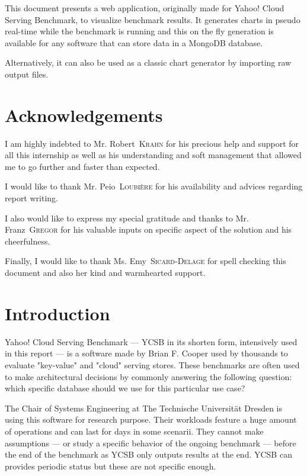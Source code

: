 \documentclass[a4paper,11pt]{report}
\newcommand*{\auteur}[2]{\large #1~\textsc{#2}} %
\begin{document}
This document presents a web application, originally made for Yahoo! Cloud Serving Benchmark, to visualize benchmark results. It generates charts in pseudo real-time while the benchmark is running and this on the fly generation is available for any software that can store data in a MongoDB database. 

Alternatively, it can also be used as a classic chart generator by importing raw output files.

\tableofcontents

\newpage

\listoffigures  %

\newpage
\chapter*{Acknowledgements}

I am highly indebted to Mr. \auteur{Robert}{Krahn} for his precious help and support for all this internship as well as his understanding and soft management that allowed me to go further and faster than expected.

I would like to thank Mr. \auteur{Peio}{Loubière} for his availability and advices regarding report writing.

I also would like to express my special gratitude and thanks to Mr. \auteur{Franz}{Gregor} for his valuable inputs on specific aspect of the solution and his cheerfulness.

Finally, I would like to thank Ms. \auteur{Emy}{Sicard-Delage} for spell checking this document and also her kind and warmhearted support.

\chapter*{Introduction}

Yahoo! Cloud Serving Benchmark --- YCSB in its shorten form, intensively used in this report --- is a software made by Brian F. Cooper \cite{ycsb:repo} used by thousands to evaluate "key-value" and "cloud" serving stores. These benchmarks are often used to make architectural decisions by commonly answering the following question: which specific database should we use for this particular use case?

The Chair of Systems Engineering at The Technische Universität Dresden is using this software for research purpose. Their workloads feature a huge amount of operations and can last for days in some scenarii. They cannot make assumptions --- or study a specific behavior of the ongoing benchmark --- before the end of the benchmark as YCSB only outputs results at the end.
YCSB can provides periodic status but these are not specific enough.
\end{document}
